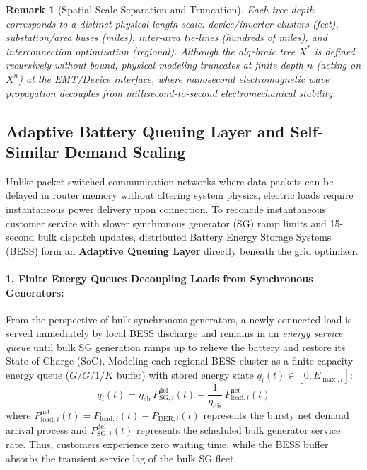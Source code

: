 \documentclass[11pt]{article}
\newtheorem{remark}{Remark}
\begin{document}
\begin{remark}[Spatial Scale Separation and Truncation]
Each tree depth corresponds to a distinct physical length scale: device/inverter clusters (feet), substation/area buses (miles), inter-area tie-lines (hundreds of miles), and interconnection optimization (regional). Although the algebraic tree $X^*$ is defined recursively without bound, physical modeling truncates at finite depth $n$ (acting on $X^n$) at the EMT/Device interface, where nanosecond electromagnetic wave propagation decouples from millisecond-to-second electromechanical stability.
\end{remark}
\subsection{Adaptive Battery Queuing Layer and Self-Similar Demand Scaling}

Unlike packet-switched communication networks where data packets can be delayed in router memory without altering system physics, electric loads require instantaneous power delivery upon connection. To reconcile instantaneous customer service with slower synchronous generator (SG) ramp limits and 15-second bulk dispatch updates, distributed Battery Energy Storage Systems (BESS) form an \textbf{Adaptive Queuing Layer} directly beneath the grid optimizer.

\paragraph{1. Finite Energy Queues Decoupling Loads from Synchronous Generators:}
From the perspective of bulk synchronous generators, a newly connected load is served immediately by local BESS discharge and remains in an \emph{energy service queue} until bulk SG generation ramps up to relieve the battery and restore its State of Charge ($\mathrm{SoC}$). Modeling each regional BESS cluster as a finite-capacity energy queue ($G/G/1/K$ buffer) with stored energy state $q_i(t) \in [0, E_{\max, i}]$:
\begin{equation}
\dot{q}_i(t) = \eta_{\mathrm{ch}}\, P_{\mathrm{SG}, i}^{\mathrm{del}}(t) - \frac{1}{\eta_{\mathrm{dis}}}\, P_{\mathrm{load}, i}^{\mathrm{net}}(t)
\end{equation}
where $P_{\mathrm{load}, i}^{\mathrm{net}}(t) = P_{\mathrm{load}, i}(t) - P_{\mathrm{DER}, i}(t)$ represents the bursty net demand arrival process and $P_{\mathrm{SG}, i}^{\mathrm{del}}(t)$ represents the scheduled bulk generator service rate. Thus, customers experience zero waiting time, while the BESS buffer absorbs the transient service lag of the bulk SG fleet.
\end{document}
